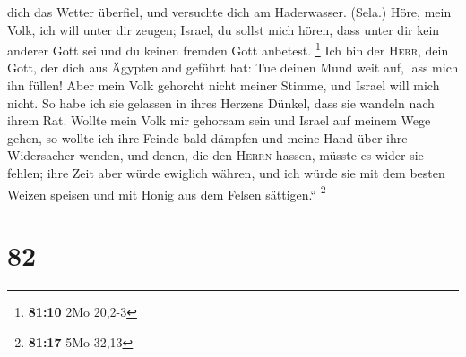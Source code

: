 dich das Wetter überfiel, und versuchte dich am Haderwasser. (Sela.)
 Höre, mein Volk, ich will unter dir zeugen; Israel, du
sollst mich hören,  dass unter dir kein anderer Gott sei
und du keinen fremden Gott anbetest. \footnote{\textbf{81:10} 2Mo 20,2-3}
 Ich bin der \textsc{Herr}, dein Gott, der dich aus
Ägyptenland geführt hat: Tue deinen Mund weit auf, lass mich ihn füllen!
 Aber mein Volk gehorcht nicht meiner Stimme, und Israel
will mich nicht.  So habe ich sie gelassen in ihres
Herzens Dünkel, dass sie wandeln nach ihrem Rat.  Wollte
mein Volk mir gehorsam sein und Israel auf meinem Wege gehen,
 so wollte ich ihre Feinde bald dämpfen und meine Hand
über ihre Widersacher wenden,  und denen, die den
\textsc{Herrn} hassen, müsste es wider sie fehlen; ihre Zeit aber würde
ewiglich währen,  und ich würde sie mit dem besten Weizen
speisen und mit Honig aus dem Felsen sättigen.`` \footnote{\textbf{81:17}
  5Mo 32,13}

\hypertarget{section-27}{%
\section{82}\label{section-27}}

